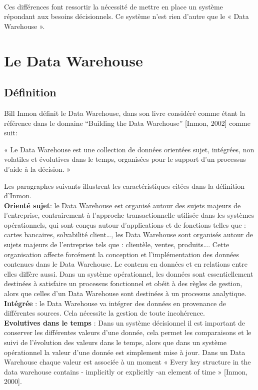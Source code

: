 \paragraph{}
	Ces différences font ressortir la nécessité de mettre en place un système répondant aux besoins décisionnels. Ce système n’est rien d’autre que le « Data Warehouse ».


\section{Le Data Warehouse}
 \subsection{Définition}
 Bill Inmon définit le Data Warehouse, dans son livre considéré comme étant la référence dans le domaine ``Building the Data Warehouse'' [Inmon, 2002] comme suit:
 
« Le Data Warehouse est une collection de données orientées sujet, intégrées, non volatiles et évolutives dans le temps, organisées pour le support d’un processus d’aide à la décision. »

Les paragraphes suivants illustrent les caractéristiques citées dans la définition d’Inmon.\\

\textbf{Orienté sujet}: le Data Warehouse est organisé autour des sujets majeurs de l’entreprise, contrairement à l’approche transactionnelle utilisée dans les systèmes opérationnels, qui sont conçus autour d’applications et de fonctions telles que : cartes bancaires, solvabilité client…, les Data Warehouse sont organisés autour de sujets majeurs de l’entreprise tels que : clientèle, ventes, produits…. Cette organisation affecte forcément la conception et l’implémentation des données contenues dans le Data Warehouse. Le contenu en données et en relations entre elles diffère aussi. Dans un système opérationnel, les données sont essentiellement destinées à satisfaire un processus fonctionnel et obéit à des règles de gestion, alors que celles d’un Data Warehouse sont destinées à un processus analytique.\\

\textbf{Intégrée }: le Data Warehouse va intégrer des données en provenance de différentes sources. Cela nécessite la gestion de toute incohérence.\\

\textbf{Evolutives dans le temps} : Dans un système décisionnel il est important de conserver les différentes valeurs d’une donnée, cela permet les comparaisons et le suivi de l’évolution des valeurs dans le temps, alors que dans un système opérationnel la valeur d’une donnée est simplement mise à jour. Dans un Data Warehouse chaque valeur est associée à un moment
« Every key structure in the data warehouse contains - implicitly or explicitly -an element of time » [Inmon, 2000].\\

